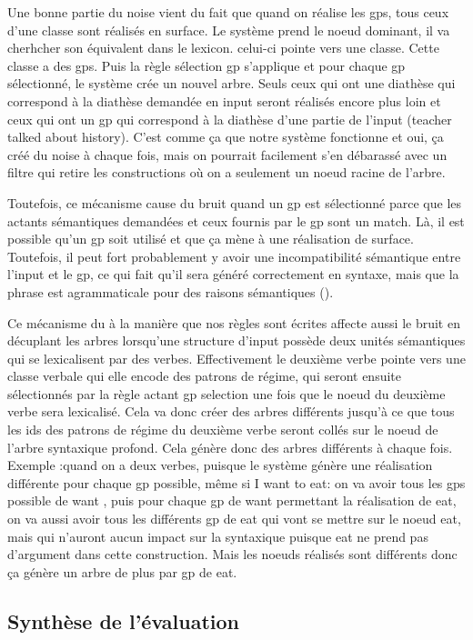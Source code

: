Une bonne partie du noise vient du fait que quand on réalise les gps, tous ceux d'une classe sont réalisés en surface. Le système prend le noeud dominant, il va cherhcher son équivalent dans le lexicon. celui-ci pointe vers une classe. Cette classe a des gps. Puis la règle sélection gp s'applique et pour chaque gp sélectionné, le système crée un nouvel arbre. Seuls ceux qui ont une diathèse qui correspond à la diathèse demandée en input seront réalisés encore plus loin et ceux qui ont un gp qui correspond à la diathèse d'une partie de l'input (teacher talked about history). C'est comme ça que notre système fonctionne et oui, ça créé du noise à chaque fois, mais on pourrait facilement s'en débarassé avec un filtre qui retire les constructions où on a seulement un noeud racine de l'arbre.

Toutefois, ce mécanisme cause du bruit quand un gp est sélectionné parce que les actants sémantiques demandées et ceux fournis par le gp sont un match. Là, il est possible qu'un gp soit utilisé et que ça mène à une réalisation de surface. Toutefois, il peut fort probablement y avoir une incompatibilité sémantique entre l'input et le gp, ce qui fait qu'il sera généré correctement en syntaxe, mais que la phrase est agrammaticale pour des raisons sémantiques ().

Ce mécanisme du à la manière que nos règles sont écrites affecte aussi le bruit en décuplant les arbres lorsqu'une structure d'input possède deux unités sémantiques qui se lexicalisent par des verbes. Effectivement le deuxième verbe pointe vers une classe verbale qui elle encode des patrons de régime, qui seront ensuite sélectionnés par la règle actant gp selection une fois que le noeud du deuxième verbe sera lexicalisé. Cela va donc créer des arbres différents jusqu'à ce que tous les ids des patrons de régime du deuxième verbe seront collés sur le noeud de l'arbre syntaxique profond. Cela génère donc des arbres différents à chaque fois. Exemple :quand on a deux verbes, puisque le système génère une réalisation différente pour chaque gp possible, même si I want to eat: on va avoir tous les gps possible de want , puis pour chaque gp de want permettant la réalisation de eat, on va aussi avoir tous les différents gp de eat qui vont se mettre sur le noeud eat, mais qui n'auront aucun impact sur la syntaxique puisque eat ne prend pas d'argument dans cette construction. Mais les noeuds réalisés sont différents donc ça génère un arbre de plus par gp de eat.

\subsection{Synthèse de l'évaluation}

